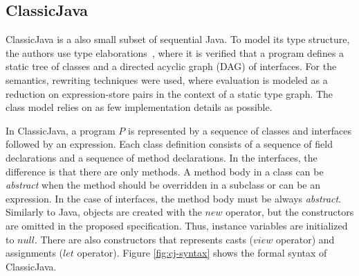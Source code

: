 \documentclass[tese,capa,english]{texufpel}
\begin{document}
\subsection{ClassicJava}

ClassicJava \cite{Flatt:1998:CM:268946.268961,Flatt:1999:PRS:645580.658808} is a also small subset of sequential Java. To model its type structure, the authors use type elaborations~\cite{Pottier:2014:HEA:2628136.2628145}, where it is verified that a program defines a static tree of classes and a directed acyclic graph (DAG) of interfaces. For the semantics, rewriting techniques were used, where evaluation is modeled as a reduction on expression-store pairs in the context of a static type graph. The class model relies on as few implementation details as possible.

In ClassicJava, a program $P$ is represented by a sequence of classes and interfaces followed by an expression. Each class definition consists of a sequence of field declarations and a sequence of method declarations. In the interfaces, the difference is that there are only methods. A method body in a class can be \emph{abstract} when the method should be overridden in a subclass or can be an expression. In the case of interfaces, the method body must be always \emph{abstract}. Similarly to Java, objects are created with the $new$ operator, but the constructors are omitted in the proposed specification. Thus, instance variables are initialized to $null$. There are also constructors that represents casts ($view$ operator) and assignments ($let$ operator). Figure \ref{fig:cj-syntax} shows the formal syntax of ClassicJava.
\end{document}
